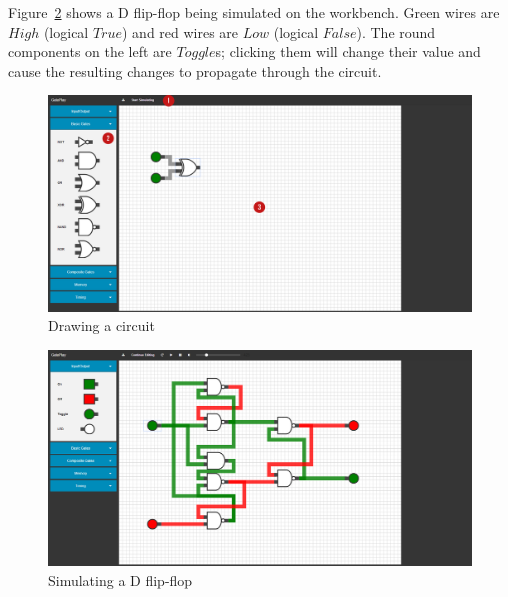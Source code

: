 Figure~\ref{fig:dflopflop} shows a D flip-flop being simulated on the workbench. Green wires are $High$ (logical $True$) and red wires are $Low$ (logical $False$). The round components on the left are $Toggle$s; clicking them will change their value and cause the resulting changes to propagate through the circuit.

\begin{figure}[p]
    \centering
    \includegraphics[width=\textheight,angle=270]{labelled.png}
    \caption{Drawing a circuit}
    \label{fig:interface}
\end{figure}

\begin{figure}[p]
    \centering
    \includegraphics[width=\textheight,angle=270]{dflipflop.png}
    \caption{Simulating a D flip-flop}
    \label{fig:dflopflop}
\end{figure}